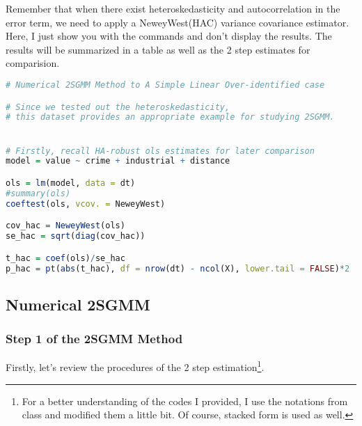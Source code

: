 \documentclass{article}
\theoremstyle{definition}
\begin{document}
Remember that when there exist heteroskedasticity and autocorrelation in the error term, we need to apply a NeweyWest(HAC) variance covariance estimator. Here, I just show you with the commands and don't display the results. The results will be summarized in a table as well as the 2 step estimates for comparision.

\begin{lstlisting}[language = R]
# Numerical 2SGMM Method to A Simple Linear Over-identified case

# Since we tested out the heteroskedasticity, 
# this dataset provides an appropriate example for studying 2SGMM.


# Firstly, recall HA-robust ols estimates for later comparison
model = value ~ crime + industrial + distance

ols = lm(model, data = dt)
#summary(ols)
coeftest(ols, vcov. = NeweyWest)

cov_hac = NeweyWest(ols)
se_hac = sqrt(diag(cov_hac))

t_hac = coef(ols)/se_hac
p_hac = pt(abs(t_hac), df = nrow(dt) - ncol(X), lower.tail = FALSE)*2	
\end{lstlisting}

\subsection{Numerical 2SGMM}

\subsubsection{Step 1 of the 2SGMM Method}\label{N2SLS}
Firstly, let's review the procedures of the 2 step estimation\footnote{For a better understanding of the codes I provided, I use the notations from class and modified them a little bit. Of course, stacked form is used as well.}.
\end{document}
